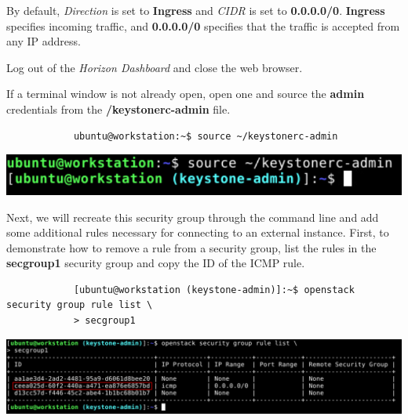 \documentclass[letterpaper, 12pt]{article}
\begin{document}
\begin{enumerate}
    \begin{notebox}
        By default, \textit{Direction} is set to \textbf{Ingress} and \textit{CIDR} is set to \textbf{0.0.0.0/0}.
        \textbf{Ingress} specifies incoming traffic, and \textbf{0.0.0.0/0} specifies that the traffic is accepted from any IP address.
    \end{notebox}

    \begin{labstep}
        Log out of the \textit{Horizon Dashboard} and close the web browser.
    \end{labstep}

    \begin{labstep}
        If a terminal window is not already open, open one and source the \textbf{admin} credentials from the
        \textbf{\texttildemid/keystonerc-admin} file.
        \begin{lstlisting}
            ubuntu@workstation:~$ source ~/keystonerc-admin
        \end{lstlisting}

        \begin{center}
            \includegraphics[width=\linewidth]{images/part5/step7.png}
        \end{center}
    \end{labstep}

    \begin{labstep}
        Next, we will recreate this security group through the command line and add some additional rules necessary for connecting to an external instance.
        First, to demonstrate how to remove a rule from a security group, list the rules in the \textbf{secgroup1} security group and copy the ID of the ICMP rule.
        \begin{lstlisting}
            [ubuntu@workstation (keystone-admin)]:~$ openstack security group rule list \
            > secgroup1
        \end{lstlisting}

        \begin{center}
            \includegraphics[width=\linewidth]{images/part5/step8.png}
        \end{center}
    \end{labstep}


\end{enumerate}
\end{document}
